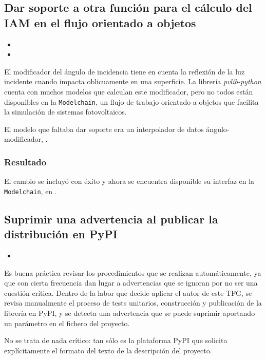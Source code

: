 \subsection{Dar soporte a otra función para el cálculo del IAM en el flujo orientado a objetos}

\begin{itemize}
    \item {}
    \item {}
\end{itemize}

El modificador del ángulo de incidencia tiene en cuenta la reflexión de la luz incidente cuando impacta oblicuamente en una superficie. La librería \textit{pvlib-python} cuenta con muchos modelos que calculan este modificador, pero no todos están disponibles en la \texttt{Modelchain}, un flujo de trabajo orientado a objetos que facilita la simulación de sistemas fotovoltaicos.

El modelo que faltaba dar soporte era un interpolador de datos ángulo-modificador, .

\subsubsection{Resultado}

El cambio se incluyó con éxito y ahora se encuentra disponible su interfaz en la \texttt{Modelchain}, en .

\subsection{Suprimir una advertencia al publicar la distribución en PyPI}

\begin{itemize}
    \item {}
\end{itemize}

Es buena práctica revisar los procedimientos que se realizan automáticamente, ya que con cierta frecuencia dan lugar a advertencias que se ignoran por no ser una cuestión crítica. Dentro de la labor que decide aplicar el autor de este TFG, se revisa manualmente el proceso de tests unitarios, construcción y publicación de la librería en PyPI, y se detecta una advertencia que se puede suprimir aportando un parámetro en el fichero del proyecto.

No se trata de nada crítico: tan sólo es la plataforma PyPI que solicita explícitamente el formato del texto de la descripción del proyecto.

